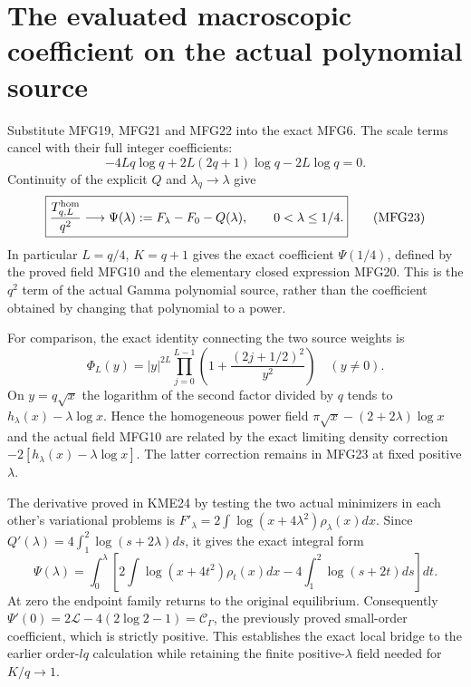 \section{The evaluated macroscopic coefficient on the actual polynomial source}

Substitute MFG19, MFG21 and MFG22 into the exact MFG6. The scale
terms cancel with their full integer coefficients:
\[
 -4Lq\log q+2L(2q+1)\log q-2L\log q=0.
\]
Continuity of the explicit $Q$ and $\lambda_q\to\lambda$ give
\[
 \boxed{\frac{T_{q,L}^{\rm hom}}{q^2}\longrightarrow
 \Psi(\lambda):=F_\lambda-F_0-Q(\lambda),
 \qquad 0<\lambda\le1/4.}
 \tag{MFG23}
\]
In particular $L=q/4$, $K=q+1$ gives the exact coefficient
$\Psi(1/4)$, defined by the proved field MFG10 and the elementary
closed expression MFG20. This is the $q^2$ term of the actual Gamma
polynomial source, rather than the coefficient obtained by changing
that polynomial to a power.

For comparison, the exact identity connecting the two source weights is
\[
 \Phi_L(y)=|y|^{2L}
             \prod_{j=0}^{L-1}\left(1+\frac{(2j+1/2)^2}{y^2}\right)
 \quad(y\ne0).
 \tag{MFG24}
\]
On $y=q\sqrt x$ the logarithm of the second factor divided by $q$
tends to $h_\lambda(x)-\lambda\log x$. Hence the homogeneous power
field $\pi\sqrt x-(2+2\lambda)\log x$ and the actual field MFG10
are related by the exact limiting density correction
$-2[h_\lambda(x)-\lambda\log x]$. The latter correction remains
in MFG23 at fixed positive $\lambda$.

The derivative proved in KME24 by testing the two actual minimizers
in each other's variational problems is
$F'_\lambda=2\int\log(x+4\lambda^2)\rho_\lambda(x)dx$.
Since $Q'(\lambda)=4\int_1^2\log(s+2\lambda)ds$, it gives the exact
integral form
\[
 \Psi(\lambda)=\int_0^\lambda\left[
 2\int\log(x+4t^2)\rho_t(x)dx
                   -4\int_1^2\log(s+2t)ds\right]dt.
 \tag{MFG25}
\]
At zero the endpoint family returns to the original equilibrium.
Consequently $\Psi'(0)=2\mathcal L-4(2\log2-1)=\mathcal C_\Gamma$,
the previously proved small-order coefficient, which is strictly
positive. This establishes the exact local bridge to the earlier
order-$lq$ calculation while retaining the finite positive-$\lambda$
field needed for $K/q\to1$.

